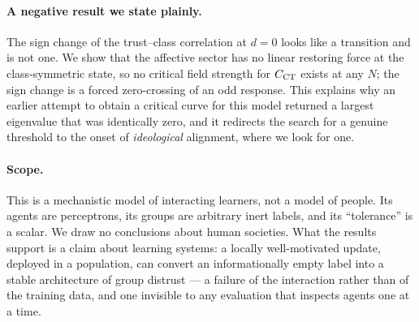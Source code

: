 \paragraph{A negative result we state plainly.}
The sign change of the trust--class correlation at $d=0$ looks like a transition
and is not one. We show that the affective sector has no linear restoring force
at the class-symmetric state, so no critical field strength for $C_{\mathrm{CT}}$ exists at
any $N$; the sign change is a forced zero-crossing of an odd response. This
explains why an earlier attempt to obtain a critical curve for this model
returned a largest eigenvalue that was identically zero, and it redirects the
search for a genuine threshold to the onset of \emph{ideological} alignment,
where we look for one.

\paragraph{Scope.}
This is a mechanistic model of interacting learners, not a model of people. Its
agents are perceptrons, its groups are arbitrary inert labels, and its
``tolerance'' is a scalar. We draw no conclusions about human societies. What
the results support is a claim about learning systems: a locally well-motivated
update, deployed in a population, can convert an informationally empty label
into a stable architecture of group distrust --- a failure of the interaction
rather than of the training data, and one invisible to any evaluation that
inspects agents one at a time.
